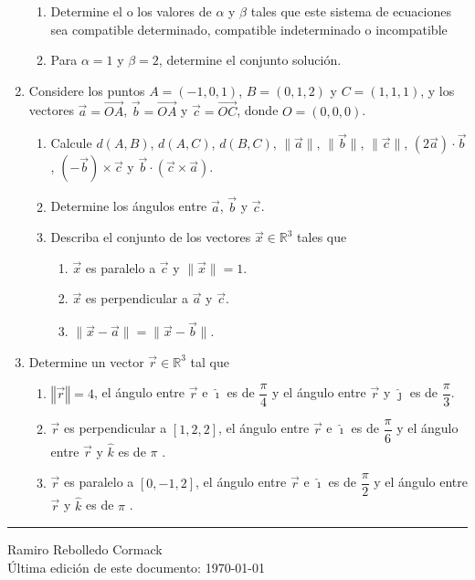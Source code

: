 \documentclass[11pt]{article}
\newcommand{\RR}{\mathbb{R}}
\newcommand{\ihat}{\hat{\imath}}
\newcommand{\jhat}{\hat{\jmath}}
\newcommand{\khat}{\hat{k}}
\begin{document}
\begin{enumerate}
  
  
  
  \begin{enumerate}
  \item Determine el o los valores de $\alpha$ y $\beta$ tales que este sistema
    de ecuaciones sea compatible determinado, compatible indeterminado
    o incompatible
    
  \item Para $\alpha=1$ y $\beta=2$, determine el conjunto soluci\'on.
  \end{enumerate}
  
\item Considere los puntos $A=(-1,0,1)$,
  $B=(0,1,2)$
  y
  $C=(1,1,1)$, y los vectores
  $\vec{a}=\overrightarrow{OA}$,
  $\vec{b}=\overrightarrow{OA}$ y
  $\vec{c}=\overrightarrow{OC}$,
  donde $O=(0,0,0)$.

  \begin{enumerate}
  \item Calcule $d(A,B)  $, $d(A,C)$,
    $d(B,C)  $, $\|\vec{a}\| $, $\|\vec{b}\|$, $\|\vec{c}\|$,
    $\left(  2\vec{a}\right)
    \cdot\vec{b}$, $\left(  -\vec{b}\right)  \times\vec{c}$
    y $\vec{b}\cdot\left(\vec{c}\times\vec{a}\right)  $.
    
  \item Determine los \'angulos entre $\vec{a}$, $\vec{b}$ y $\vec{c}$.
    
  \item Describa el conjunto de los vectores $\vec{x}\in\RR^3$
    tales que
    \begin{enumerate}
    \item $\vec{x}$ es paralelo a $\vec{c}$ y $\|\vec{x}\|=1$.
    \item $\vec{x}$ es perpendicular a $\vec{a}$ y $\vec{c}$.
    \item $\|\vec{x}-\vec{a}\| =\|\vec{x}-\vec{b}\|$.
    \end{enumerate}
    
  \end{enumerate}
  
\item Determine un vector $\vec{r}\in\RR^3$ tal que
  \begin{enumerate}
  \item $\left\Vert \vec{r}\right\Vert =4$, el \'angulo entre $\vec{r}$ e
    $\ihat$ es de $\dfrac{\pi}{4}$ y el \'angulo entre $\vec{r}$
    y $\jhat$ es de $\dfrac{\pi}{3}$.
    
  \item $\vec{r}$ es perpendicular a $\left[  1,2,2\right]  $,
    el \'angulo entre $\vec{r}$ e $\ihat$ es de
    $\dfrac{\pi}{6}$ y el \'angulo entre $\vec{r}$ y $\khat$
    es de $\pi$ .
    
  \item $\vec{r}$ es paralelo a $\left[  0,-1,2\right]  $, el \'angulo entre
    $\vec{r}$ e $\ihat$ es de $\dfrac{\pi}{2}$ y el \'angulo
    entre $\vec{r}$ y $\khat$ es de $\pi$ .
  \end{enumerate}
  
\end{enumerate}


\vfill
\hrule
\vspace{4px}
Ramiro Rebolledo Cormack\\
\'Ultima edici\'on de este documento: \today
        
\end{document}
